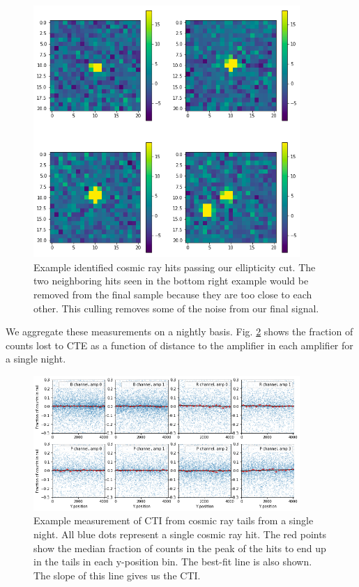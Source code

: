 \begin{figure}
    \centering
    \includegraphics[width=0.9\textwidth]{figures/cte/example_hits.png}
    \caption{Example identified cosmic ray hits passing our ellipticity cut. The two neighboring hits seen in the bottom right example would be removed from the final sample because they are too close to each other. This culling removes some of the noise from our final signal.}
    \label{fig:example_hits}
\end{figure}

We aggregate these measurements on a nightly basis. Fig. \ref{fig:cte_single_night} shows the fraction of counts lost to CTE as a function of distance to the amplifier in each amplifier for a single night.

\begin{figure}
    \centering
    \includegraphics[width=0.9\textwidth]{figures/cte/single_night_example_parallel.png}
    \caption{Example measurement of CTI from cosmic ray tails from a single night. All blue dots represent a single cosmic ray hit. The red points show the median fraction of counts in the peak of the hits to end up in the tails in each y-position bin. The best-fit line is also shown. The slope of this line gives us the CTI.}
    \label{fig:cte_single_night}
\end{figure}

